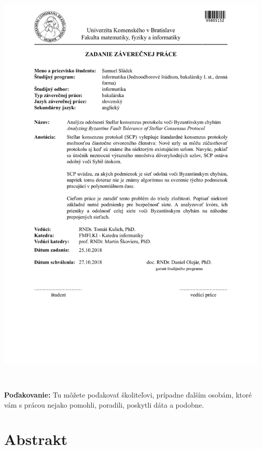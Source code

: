 \documentclass[12pt, twoside]{book}
\begin{document}
\newpage
\thispagestyle{empty}
\hspace{-2cm}\includegraphics[width=1.1\textwidth]{images/zadanie}


\frontmatter

\setcounter{page}{3}
\newpage 
~

\vfill
{\bf Poďakovanie:} Tu môžete poďakovať školiteľovi, prípadne
ďalším osobám, ktoré vám s prácou nejako pomohli, poradili,
poskytli dáta a podobne.


\newpage 
\section*{Abstrakt}
\end{document}
